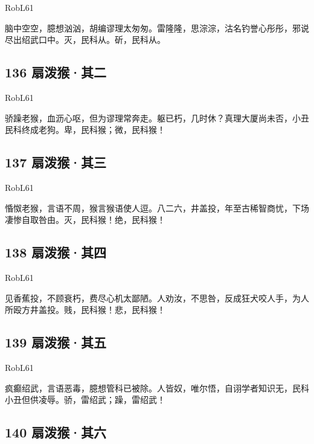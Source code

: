 {RobL61}

脑中空空，臆想汹汹，胡编谬理太匆匆。雷隆隆，思淙淙，沽名钓誉心彤彤，邪说尽出绍武口中。灭，民科从。斫，民科从。

\hypertarget{ux6247ux6cfcux7334ux5176ux4e8c}{%
\subsection{136 扇泼猴·其二}\label{ux6247ux6cfcux7334ux5176ux4e8c}}

{RobL61}

骄躁老猴，血沥心呕，但为谬理常奔走。躯已朽，几时休？真理大厦尚未否，小丑民科终成老狗。卑，民科猴；微，民科猴！

\hypertarget{ux6247ux6cfcux7334ux5176ux4e09}{%
\subsection{137 扇泼猴·其三}\label{ux6247ux6cfcux7334ux5176ux4e09}}

{RobL61}

惛怓老猴，言语不周，猴言猴语使人逗。八二六，井盖投，年至古稀智商忧，下场凄惨自取咎由。灭，民科猴！绝，民科猴！

\hypertarget{ux6247ux6cfcux7334ux5176ux56db}{%
\subsection{138 扇泼猴·其四}\label{ux6247ux6cfcux7334ux5176ux56db}}

{RobL61}

见香蕉投，不顾衰朽，费尽心机太鄙陋。人劝汝，不思咎，反成狂犬咬人手，为人所殴方井盖投。贱，民科猴！悲，民科猴！
~\\

\hypertarget{ux6247ux6cfcux7334ux5176ux4e94}{%
\subsection{139 扇泼猴·其五}\label{ux6247ux6cfcux7334ux5176ux4e94}}

{RobL61}

疯癫绍武，言语恶毒，臆想管科已被除。人皆奴，唯尔悟，自诩学者知识无，民科小丑但供凌辱。骄，雷绍武；躁，雷绍武！
~\\

\hypertarget{ux6247ux6cfcux7334ux5176ux516d}{%
\subsection{140 扇泼猴·其六}\label{ux6247ux6cfcux7334ux5176ux516d}}

